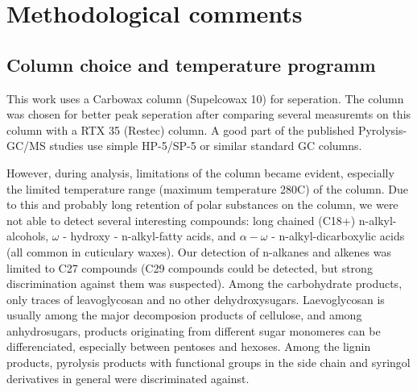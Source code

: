 % 
% 
% 
% 

\chapter{Methodological comments}

\section{Column choice and temperature programm}
This work uses a Carbowax column (Supelcowax 10) for seperation. The column was chosen for better peak seperation after comparing several measuremts on this column with a RTX 35 (Restec) column. A good part of the published Pyrolysis-GC/MS studies use simple HP-5/SP-5 or similar standard GC columns.

However, during analysis, limitations of the column became evident, especially the limited temperature range (maximum temperature 280\textdegree C) of the column. Due to this and probably long retention of polar substances on the column, we were not able to detect several interesting compounds: long chained (C18+) n-alkyl-alcohols, $\omega$ - hydroxy - n-alkyl-fatty acids, and $\alpha - \omega$ - n-alkyl-dicarboxylic acids (all common in cuticulary waxes). Our detection of n-alkanes and alkenes was limited to C27 compounds (C29 compounds could be detected, but strong discrimination against them was suspected). Among the carbohydrate products, only traces of leavoglycosan and no other dehydroxysugars. Laevoglycosan is usually among the major decomposion products of cellulose, and among anhydrosugars, products originating from different sugar monomeres can be differenciated, especially between pentoses and hexoses. 
Among the lignin products, pyrolysis products with functional groups in the side chain and syringol derivatives in general were discriminated against. 

